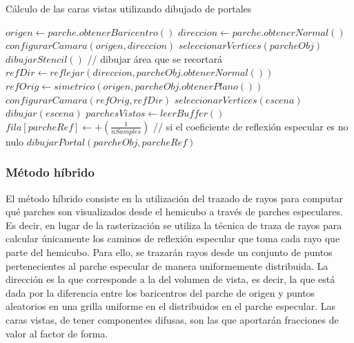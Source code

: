\begin{algorithm}
	\caption{Cálculo de las caras vistas utilizando dibujado de portales}
	\label{alg:9}
		\fontsize{8}{8}\selectfont
	\begin{algorithmic}
		\State $origen \gets parche.obtenerBaricentro()$
		\State $direccion \gets parche.obtenerNormal()$
		\State $configurarCamara(origen, direccion)$
		\State $seleccionarVertices(parcheObj)$
		\State $dibujarStencil()$ // dibujar área que se recortará
		\State $refDir \gets reflejar(direccion, parcheObj.obtenerNormal())$
		\State $refOrig \gets simetrico(origen, parcheObj.obtenerPlano())$
		\State $configurarCamara(refOrig, refDir)$
		\State $seleccionarVertices(escena)$
		\State $dibujar(escena)$
		\State $parchesVistos \gets leerBuffer()$
		\State $fila[parcheRef] \gets +(\frac{1}{nSamples})$
		 // si el coeficiente de reflexión especular es no nulo
		\State $dibujarPortal(parcheObj, parcheRef)$
		\EndIf
		\EndIf
		\EndLoop
		\EndFunction
	\end{algorithmic}
\end{algorithm}
\subsubsection{Método híbrido}

El método híbrido consiste en la utilización del trazado de rayos para computar qué parches son visualizados desde el hemicubo a través de parches especulares. Es decir, en lugar de la rasterización se utiliza la técnica de traza de rayos para calcular únicamente los caminos de reflexión especular que toma cada rayo que parte del hemicubo. Para ello, se trazarán rayos desde un conjunto de puntos pertenecientes al parche especular de manera uniformemente distribuida. La dirección es la que corresponde a la del volumen de vista, es decir, la que está dada por la diferencia entre los baricentros del parche de origen y puntos aleatorios en una grilla uniforme en el distribuidos en el parche especular. Las caras vistas, de tener componentes difusas, son las que aportarán fracciones de valor al factor de forma.

